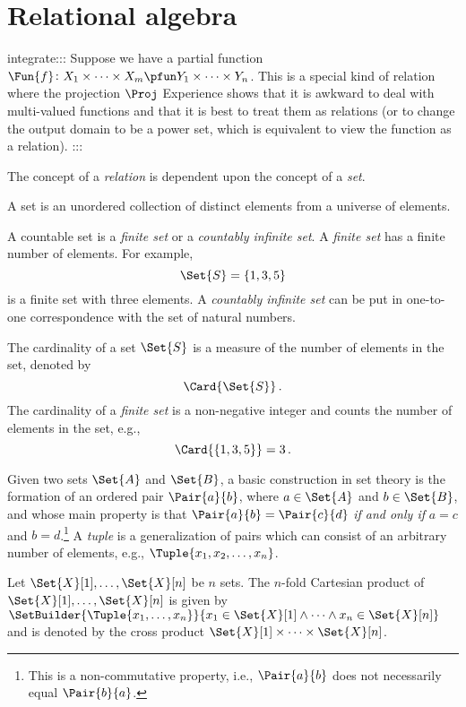 \documentclass[ ../main.tex]{subfiles}
\begin{document}
\section{Relational algebra}
\label{sec:relations}
integrate:::
Suppose we have a partial function $\Fun{f} \colon X_1 \times \cdots \times X_m \pfun Y_1 \times \cdots \times Y_n$.
This is a special kind of relation where the projection $\Proj$
Experience shows that it is awkward to deal with multi-valued functions and that it is best to treat them as relations (or to change the output domain to be a power set, which is equivalent to view the function as a relation).
:::



The concept of a \emph{relation} is dependent upon the concept of a \emph{set}.
\begin{definition}
A set is an unordered collection of distinct elements from a universe of elements.
\end{definition}
A countable set is a \emph{finite set} or a \emph{countably infinite set}. A \emph{finite set} has a finite number of elements. For example,
\[
    \Set{S} = \{ 1, 3, 5 \}
\]
is a finite set with three elements. A \emph{countably infinite set} can be put in one-to-one correspondence with the set of natural numbers.

The cardinality of a set $\Set{S}$ is a measure of the number of elements in the set, denoted by
\begin{equation}
    \Card{\Set{S}}\,.
\end{equation}
The cardinality of a \emph{finite set} is a non-negative integer and counts the number of elements in the set, e.g.,
\[
    \Card{\left\{ 1, 3, 5\right\}} = 3\,.
\]

Given two sets $\Set{A}$ and $\Set{B}$, a basic construction in set theory is the formation of an ordered pair $\Pair{a}{b}$, where $a \in \Set{A}$ and $b \in \Set{B}$, and whose main property is that $\Pair{a}{b} = \Pair{c}{d}$ \emph{if and only if} $a = c$ and $b = d$.\footnote{This is a non-commutative property, i.e., $\Pair{a}{b}$ does not necessarily equal $\Pair{b}{a}$.} A \emph{tuple} is a generalization of pairs which can consist of an arbitrary number of elements, e.g., $\Tuple{x_1,x_2,\ldots,x_n}$.

\begin{definition}
Let $\Set{X}[1], \ldots, \Set{X}[n]$ be $n$ sets. The $n$-fold Cartesian product of $\Set{X}[1],\ldots,\Set{X}[n]$ is given by $\SetBuilder{\Tuple{x_1,\ldots,x_n}}{x_1 \in \Set{X}[1] \land \cdots \land x_n \in \Set{X}[n]}$ and is denoted by the cross product $\Set{X}[1] \times \cdots \times \Set{X}[n]$.
\end{definition}
\end{document}
